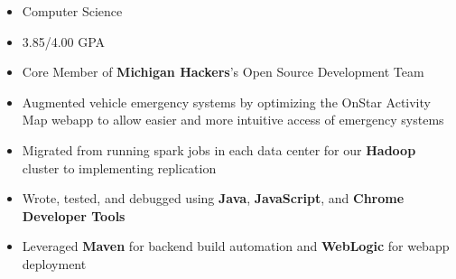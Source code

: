 \documentclass[10pt,a4paper,ragged2e]{altacv}
\begin{document}
\tagline{}

\begin{fullwidth}
\makecvheader
\end{fullwidth}



\begin{itemize}
    \item Computer Science
    \smallskip
    \item 3.85/4.00 GPA
    \smallskip
    \item Core Member of \textbf{Michigan Hackers}'s Open Source Development Team
\end{itemize}



\begin{itemize}
\item Augmented vehicle emergency systems by optimizing the OnStar Activity Map webapp to allow easier and more intuitive access of emergency systems
\smallskip
\item Migrated from running spark jobs in each data center for our \textbf{Hadoop} cluster to implementing replication
\smallskip
\item Wrote, tested, and debugged using \textbf{Java}, \textbf{JavaScript}, and \textbf{Chrome Developer Tools}
\smallskip
\item Leveraged \textbf{Maven} for backend build automation and \textbf{WebLogic} for webapp deployment
\end{itemize}
\end{document}
